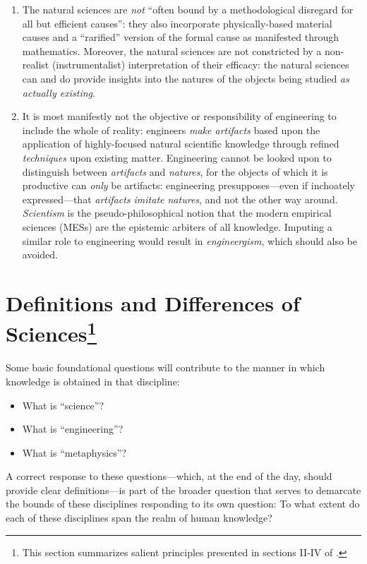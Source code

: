 \begin{enumerate}
\item The natural sciences are \textit{not} ``often bound by a methodological disregard for all but efficient causes'': they also incorporate physically-based material causes and a ``rarified'' version of the formal cause as manifested through mathematics. Moreover, the natural sciences are not constricted by a non-realist (instrumentalist) interpretation of their efficacy: the natural sciences can and do provide insights into the natures of the objects being studied \textit{as actually existing}.
\item It is most manifestly not the objective or responsibility of engineering to include the whole of reality: engineers \textit{make artifacts} based upon the application of highly-focused natural scientific knowledge through refined \textit{techniques} upon existing matter. Engineering cannot be looked upon to distinguish between \textit{artifacts} and \textit{natures}, for the objects of which it is productive can \textit{only} be artifacts: engineering presupposes---even if inchoately expressed---that \textit{artifacts imitate natures}, and not the other way around. \textit{Scientism} is the pseudo-philosophical notion that the modern empirical sciences (MESs) are the epistemic arbiters of all knowledge. Imputing a similar role to engineering would result in \textit{engineergism}, which should also be avoided.
\end{enumerate}

\section[Definitions and Differences of Sciences]{Definitions and Differences of Sciences\footnote{This section summarizes salient principles presented in sections II-IV of \citet[][pgs. 23--167]{adler1978}.}}

Some basic foundational questions will contribute to the manner in which knowledge is obtained in that discipline:

\begin{itemize}
\item What is ``science''?
\item What is ``engineering''?
\item What is ``metaphysics''?
\end{itemize}

A correct response to these questions---which, at the end of the day, should provide clear definitions---is part of the broader question that serves to demarcate the bounds of these disciplines responding to its own question: To what extent do each of these disciplines span the realm of human knowledge?

